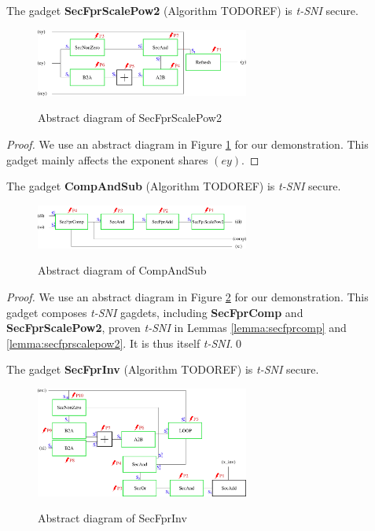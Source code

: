 \documentclass[runningheads]{llncs}
\begin{document}
\begin{lemma}\label{lemma:secfprscalepow2}
  The gadget \textbf{SecFprScalePow2} (Algorithm TODOREF) is \emph{t-SNI} secure.
\end{lemma}

\begin{figure}[ht]
  \centering
  \includegraphics[width=7cm]{definitive scheme/Secfprscal2pow.pdf}
  \label{fig:secfprscalepow2}
  \caption{Abstract diagram of SecFprScalePow2}
\end{figure}

\begin{proof}
  We use an abstract diagram in Figure \ref{fig:secfprscalepow2} for our demonstration. This gadget mainly affects the exponent shares $(ey)$.
\end{proof}

\begin{lemma}\label{lemma:compandsub}
  The gadget \textbf{CompAndSub} (Algorithm TODOREF) is \emph{t-SNI} secure.
\end{lemma}

\begin{figure}[ht]
  \centering
  \includegraphics[width=7cm]{definitive scheme/SecFprInv/CompAndSub.pdf}
  \label{fig:compandsub}
  \caption{Abstract diagram of CompAndSub}
\end{figure}

\begin{proof}
  We use an abstract diagram in Figure \ref{fig:compandsub} for our demonstration. This gadget composes \emph{t-SNI} gagdets, including \textbf{SecFprComp} and \textbf{SecFprScalePow2}, proven \emph{t-SNI} in Lemmas \ref{lemma:secfprcomp} and \ref{lemma:secfprscalepow2}. It is thus itself \emph{t-SNI}.\hfill \qed
\end{proof}

\begin{theorem}
  The gadget \textbf{SecFprInv} (Algorithm TODOREF) is \emph{t-SNI} secure.
\end{theorem}

\begin{figure}[ht]
  \centering
  \includegraphics[width=7cm]{definitive scheme/SecFprInv/SecFprInv.pdf}
  \label{fig:secfprinv}
  \caption{Abstract diagram of SecFprInv} 
\end{figure}
\end{document}
